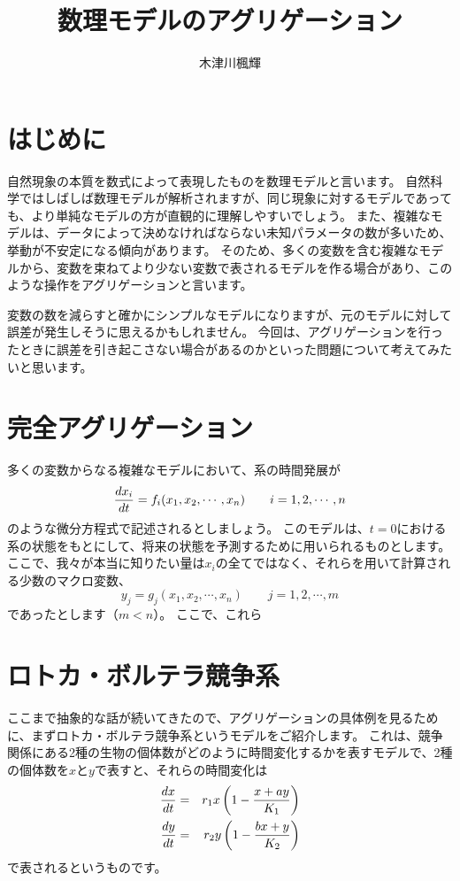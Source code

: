 \documentclass[a5paper]{jsarticle}
\begin{document}
\title{数理モデルのアグリゲーション}
\author{木津川楓輝}
\date{}
\pagestyle{empty}
\maketitle
\section{はじめに}
自然現象の本質を数式によって表現したものを数理モデルと言います。
自然科学ではしばしば数理モデルが解析されますが、同じ現象に対するモデルであっても、より単純なモデルの方が直観的に理解しやすいでしょう。
また、複雑なモデルは、データによって決めなければならない未知パラメータの数が多いため、挙動が不安定になる傾向があります。
そのため、多くの変数を含む複雑なモデルから、変数を束ねてより少ない変数で表されるモデルを作る場合があり、このような操作をアグリゲーションと言います。

変数の数を減らすと確かにシンプルなモデルになりますが、元のモデルに対して誤差が発生しそうに思えるかもしれません。
今回は、アグリゲーションを行ったときに誤差を引き起こさない場合があるのかといった問題について考えてみたいと思います。
\section{完全アグリゲーション}
多くの変数からなる複雑なモデルにおいて、系の時間発展が
\[
  \dv{x_i}{t} = f_i(x_1, x_2, \cdots, x_n) \qquad i = 1, 2, \cdots, n
\]
のような微分方程式で記述されるとしましょう。
このモデルは、$t = 0$における系の状態をもとにして、将来の状態を予測するために用いられるものとします。
ここで、我々が本当に知りたい量は$x_i$の全てではなく、それらを用いて計算される少数のマクロ変数、
\[
  y_j = g_j(x_1, x_2, \cdots, x_n) \qquad j = 1, 2, \cdots, m
\]
であったとします（$m < n$）。
ここで、これら
\section{ロトカ・ボルテラ競争系}
ここまで抽象的な話が続いてきたので、アグリゲーションの具体例を見るために、まずロトカ・ボルテラ競争系というモデルをご紹介します。
これは、競争関係にある2種の生物の個体数がどのように時間変化するかを表すモデルで、2種の個体数を$x$と$y$で表すと、それらの時間変化は
\begin{eqnarray*}
  \dv{x}{t} & = & r_1x\left(1 - \frac{x + ay}{K_1}\right) \\
  \dv{y}{t} & = & r_2y\left(1 - \frac{bx + y}{K_2}\right)
\end{eqnarray*}
で表されるというものです。
\end{document}
